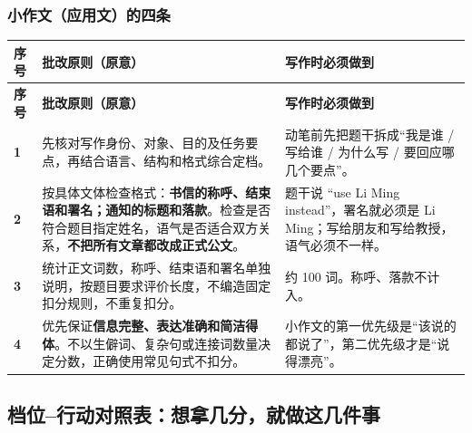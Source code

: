 \documentclass[11pt,a4paper]{ctexart}
\begin{document}
\subsubsection{小作文（应用文）的四条}

\begin{longtable}{C{0.9cm} L{7.0cm} L{7.6cm}}
\toprule
\textbf{序号} & \textbf{批改原则（原意）} & \textbf{写作时必须做到}\\
\midrule
\endfirsthead
\toprule
\textbf{序号} & \textbf{批改原则（原意）} & \textbf{写作时必须做到}\\
\midrule
\endhead
\textbf{1} & 先核对写作身份、对象、目的及任务要点，再结合语言、结构和格式综合定档。 & 动笔前先把题干拆成“我是谁 / 写给谁 / 为什么写 / 要回应哪几个要点”。\\
\midrule
\textbf{2} & 按具体文体检查格式：\textbf{书信的称呼、结束语和署名；通知的标题和落款}。检查是否符合题目指定姓名，语气是否适合双方关系，\textbf{不把所有文章都改成正式公文}。 & 题干说 “use Li Ming instead”，署名就必须是 Li Ming；写给朋友和写给教授，语气必须不一样。\\
\midrule
\textbf{3} & 统计正文词数，称呼、结束语和署名单独说明，按题目要求评价长度，不编造固定扣分规则，不重复扣分。 & 约 100 词。称呼、落款不计入。\\
\midrule
\textbf{4} & 优先保证\textbf{信息完整、表达准确和简洁得体}。不以生僻词、复杂句或连接词数量决定分数，正确使用常见句式不扣分。 & 小作文的第一优先级是“该说的都说了”，第二优先级才是“说得漂亮”。\\
\bottomrule
\end{longtable}

\subsection{档位--行动对照表：想拿几分，就做这几件事}
\end{document}
